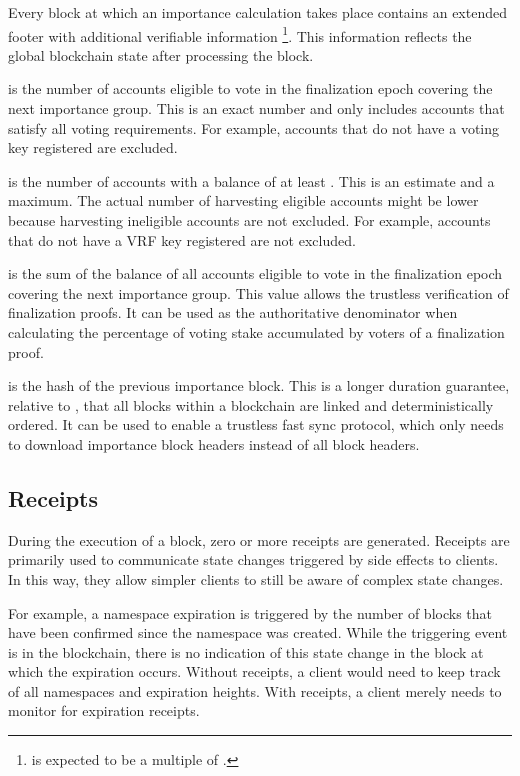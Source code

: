 Every block at which an importance calculation takes place contains an extended footer with additional verifiable information
\footnote{ is expected to be a multiple of .}.
This information reflects the global blockchain state after processing the block.

 is the number of accounts eligible to vote in the finalization epoch covering the next importance group.
This is an exact number and only includes accounts that satisfy all voting requirements.
For example, accounts that do not have a voting key registered are excluded.

 is the number of accounts with a balance of at least .
This is an estimate and a maximum.
The actual number of harvesting eligible accounts might be lower because harvesting ineligible accounts are not excluded.
For example, accounts that do not have a VRF key registered are not excluded.

 is the sum of the balance of all accounts eligible to vote in the finalization epoch covering the next importance group.
This value allows the trustless verification of finalization proofs.
It can be used as the authoritative denominator when calculating the percentage of voting stake accumulated by voters of a finalization proof.

 is the hash of the previous importance block.
This is a longer duration guarantee, relative to , that all blocks within a blockchain are linked and deterministically ordered.
It can be used to enable a trustless fast sync protocol, which only needs to download importance block headers instead of all block headers.

\subsection{Receipts}
\label{sec:blocks:receipts}

During the execution of a block, zero or more receipts are generated.
Receipts are primarily used to communicate state changes triggered by side effects to clients.
In this way, they allow simpler clients to still be aware of complex state changes.

For example, a namespace expiration is triggered by the number of blocks that have been confirmed since the namespace was created.
While the triggering event is in the blockchain, there is no indication of this state change in the block at which the expiration occurs.
Without receipts, a client would need to keep track of all namespaces and expiration heights.
With receipts, a client merely needs to monitor for expiration receipts.

